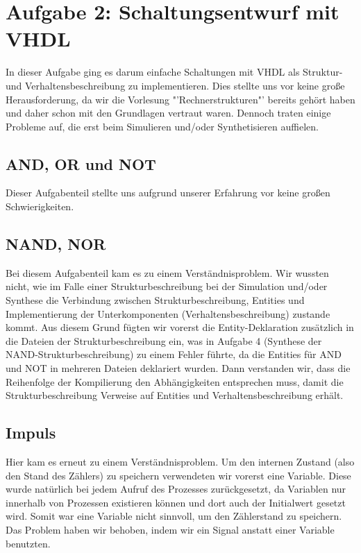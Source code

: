\documentclass[parskip=full]{scrartcl}
\begin{document}
		
	\section*{Aufgabe 2: Schaltungsentwurf mit VHDL}	
		\setcounter{section}{2}
		\setcounter{subsection}{0}
		In dieser Aufgabe ging es darum einfache Schaltungen mit VHDL als Struktur- und Verhaltensbeschreibung zu implementieren. Dies stellte uns vor keine große Herausforderung, da wir
		die Vorlesung "'Rechnerstrukturen"' bereits gehört haben und daher schon mit den Grundlagen vertraut waren. Dennoch traten einige Probleme auf, die erst beim Simulieren und/oder Synthetisieren auffielen.
		\subsection{AND, OR und NOT}
			Dieser Aufgabenteil stellte uns aufgrund unserer Erfahrung vor keine großen Schwierigkeiten.
		\subsection{NAND, NOR}
			Bei diesem Aufgabenteil kam es zu einem Verständnisproblem. Wir wussten nicht, wie im Falle einer Strukturbeschreibung bei der Simulation und/oder Synthese  die Verbindung zwischen
			Strukturbeschreibung, Entities und Implementierung der Unterkomponenten (Verhaltensbeschreibung) zustande kommt. Aus diesem Grund fügten wir vorerst die Entity-Deklaration zusätzlich
			in die Dateien der Strukturbeschreibung ein, was in Aufgabe 4 (Synthese der NAND-Strukturbeschreibung) zu einem Fehler führte, da die Entities für AND und NOT in mehreren Dateien deklariert wurden. Dann verstanden wir, dass die Reihenfolge der Kompilierung den Abhängigkeiten entsprechen muss, damit die Strukturbeschreibung Verweise auf Entities und Verhaltensbeschreibung erhält.
		\subsection{Impuls}
			Hier kam es erneut zu einem Verständnisproblem. Um den internen Zustand (also den Stand des Zählers) zu speichern verwendeten wir vorerst eine Variable. Diese wurde natürlich bei jedem Aufruf des Prozesses zurückgesetzt, da Variablen nur innerhalb von Prozessen existieren können und dort auch der Initialwert gesetzt wird. Somit war eine Variable nicht sinnvoll, um den Zählerstand zu speichern. Das Problem haben wir behoben, indem wir ein Signal anstatt einer Variable benutzten.
\end{document}
